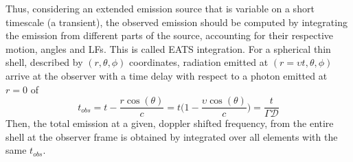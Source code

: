 %
%
%
%
Thus, considering an extended emission source that is variable on a short 
timescale (a transient), the observed emission should be computed by integrating 
the emission from different parts of the source, accounting for their respective 
motion, angles and \acp{LF}. This is called \ac{EATS} integration. For a spherical 
thin shell, described by $(r, \theta, \phi)$ coordinates, radiation emitted 
at $(r=\upsilon t, \theta,\phi)$ arrive at the observer with a time delay with 
respect to a photon emitted at $r=0$ of
%
\begin{equation}
t_{obs} = t - \frac{r \cos(\theta)}{c} = t\Big(1-\frac{\upsilon\cos(\theta)}{c}\Big) = \frac{t}{\Gamma\mathcal{D}}
\label{eq:afterglow:tobs}
\end{equation}
%
Then, the total emission at a given, doppler shifted frequency, from the entire 
shell at the observer frame is obtained by integrated over all elements with the 
same $t_{obs}$.

%

